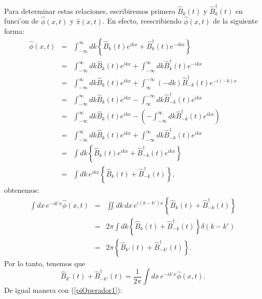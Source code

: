 Para determinar estas relaciones, escribiremos primero $\hat{B}_k(t) $ y
$\hat{B}_k^\dagger (t) $ en funci'on de $\hat{\phi}(x,t) $ y $\hat{\pi}(x,t) $.
En efecto, reescribiendo $\hat{\phi}(x,t) $ de la siguiente forma: 
\begin{eqnarray}
\hat{\phi}(x,t) & = &\int_{-\infty}^{\infty} dk\left\{
\hat{B}_k(t)e^{ikx}+\hat{B}_k^\dagger (t) e^{-ikx}\right\} \\
& = &\int_{-\infty}^{\infty}dk\hat{B}_k(t)
e^{ikx}+\int_{-\infty}^{\infty}dk\hat{B}_k^\dagger (t) e^{-ikx}\\
& = &\int_{-\infty}^{\infty}dk\hat{B}_k(t)
e^{ikx}+\int_{\infty}^{-\infty}\left( -dk\right) \hat{B}_{-k}^\dagger (t)
e^{-i( -k) x}\\
& = &\int_{-\infty}^{\infty}dk\hat{B}_k(t)
e^{ikx}-\int_{\infty}^{-\infty}dk\hat{B}_{-k}^\dagger (t) e^{ikx}\\
& = &\int_{-\infty}^{\infty}dk\hat{B}_k(t)
e^{ikx}-\left(-\int_{-\infty}^{\infty}dk\hat{B}_{-k}^{\dagger}(t)e^{ikx}\right)\\
& = &\int_{-\infty}^{\infty}dk\hat{B}_k(t) e^{ikx}+\int
_{-\infty}^{\infty}dk\hat{B}_{-k}^\dagger (t) e^{ikx} \\
& = &\int dk\left\{ \hat{B}_k(t) e^{ikx}+\hat{B}_{-k}^\dagger (t)
e^{ikx}\right\} \\
& = &\int dk\,e^{ikx}\left\{ \hat{B}_k(t) +\hat{B}_{-k}^\dagger \left(
t\right) \right\} ,\label{qOperador2} 
\end{eqnarray}
obtenemos:
\begin{eqnarray}
\int dx\,e^{-ik'x}\hat{\phi}(x,t)  & = &\iint dk\,dx\,e^{i(k-k') x}\left\{
\hat{B}_k(t) +\hat{B}_{-k}^\dagger (t) \right\} \\
& = &2\pi\int dk\left\{ \hat{B}_k\left(t\right) +\hat{B}_{-k}^\dagger (t)
\right\} \delta(k-k') \\
& = &2\pi\left\{ \hat{B}_{k'}(t) +\hat{B}_{-k'}^\dagger (t) \right\} .
\end{eqnarray}
Por lo tanto, tenemos que
\begin{equation}
\hat{B}_{k'}(t) +\hat{B}_{-k'}^\dagger (t)  = \frac{1}{2\pi}\int
dx\,e^{-ik'x}\hat{\phi}(x,t) \label{Rel1}.
\end{equation}
De igual manera con (\ref{piOperador1}):
